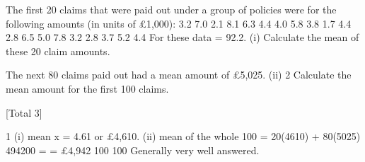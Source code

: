 \documentclass[a4paper,12pt]{article}
\begin{document}
\begin{enumerate}
The first 20 claims that were paid out under a group of policies were for the following
amounts (in units of £1,000):
3.2
7.0
2.1
8.1
6.3
4.4
4.0
5.8
3.8
1.7
4.4
2.8
6.5
5.0
7.8
3.2
2.8
3.7
5.2
4.4
For these data \sumx = 92.2.
(i)
Calculate the mean of these 20 claim amounts.

The next 80 claims paid out had a mean amount of £5,025.
(ii)
2
Calculate the mean amount for the first 100 claims.

[Total 3]

\end{enumerate}
\newpage
1
(i) mean x = 4.61 or £4,610.
(ii) mean of the whole 100 =
20(4610) + 80(5025) 494200
=
= £4,942
100
100
Generally very well answered.
\end{document}
